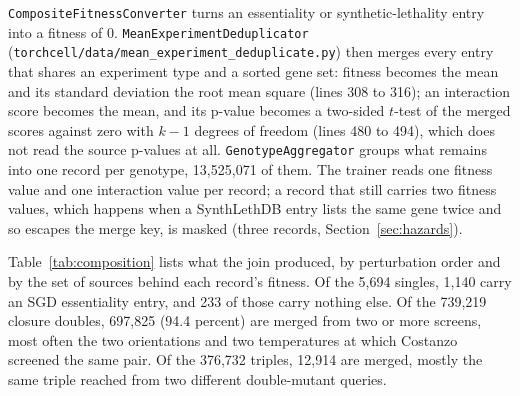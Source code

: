 \texttt{CompositeFitnessConverter} turns an essentiality or synthetic-lethality entry
into a fitness of 0. \texttt{MeanExperimentDeduplicator}
(\texttt{torchcell/data/mean\_experiment\_deduplicate.py}) then merges every entry
that shares an experiment type and a sorted gene set: fitness becomes the mean and
its standard deviation the root mean square (lines 308 to 316); an interaction score
becomes the mean, and its p-value becomes a two-sided $t$-test of the merged scores
against zero with $k-1$ degrees of freedom (lines 480 to 494), which does not read the
source p-values at all. \texttt{GenotypeAggregator} groups what remains into one
record per genotype, 13{,}525{,}071 of them. The trainer reads one fitness value and
one interaction value per record; a record that still carries two fitness values,
which happens when a SynthLethDB entry lists the same gene twice and so escapes the
merge key, is masked (three records, Section~\ref{sec:hazards}).

Table~\ref{tab:composition} lists what the join produced, by perturbation order and by
the set of sources behind each record's fitness. Of the 5{,}694 singles, 1{,}140
carry an SGD essentiality entry, and 233 of those carry nothing else. Of the
739{,}219 closure doubles, 697{,}825 (94.4 percent) are merged from two or more
screens, most often the two orientations and two temperatures at which Costanzo
screened the same pair. Of the 376{,}732 triples, 12{,}914 are merged, mostly the
same triple reached from two different double-mutant queries.

\begin{table}[htbp]
\centering
\footnotesize
\caption{Records of the S3 pool by perturbation order and by the sources joined into
their fitness value. Generated by \texttt{s3\_closure\_recompute.py}
(\texttt{results/s3\_closure\_composition.csv}). ``GeneEssentialitySgd'' means an
essentiality entry converted to a fitness of 0 entered the mean.}
\label{tab:composition}

\end{table}

